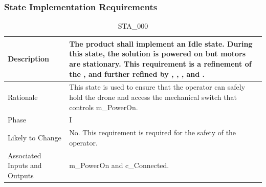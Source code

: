 \documentclass{article}
\begin{document}
\subsubsection{State Implementation Requirements}
\label{sec:stateReqs}

\begin{table}[!h]
\begin{center}
\caption {STA\_000} 
\label{STA_000}
\begin{tabular}{ | m{3cm} | m{11cm} | } 

\hline
Description & The product shall implement an Idle state. During this state, the solution is powered on but motors are stationary. This requirement is a refinement of the \nameref{Idle State}, and further refined by \nameref{PERF_007}, \nameref{SAFE_001}, \nameref{SAFE_003}, and \nameref{USE_003}. \\
\hline
Rationale & This state is used to ensure that the operator can safely hold the drone and access the mechanical switch that controls m\_PowerOn. \\
\hline
Phase & I \\
\hline
Likely to Change & No. This requirement is required for the safety of the operator. \\
\hline
Associated Inputs and Outputs & m\_PowerOn and c\_Connected. \\
\hline
\end{tabular}
\end{center}
\end{table}
\end{document}
